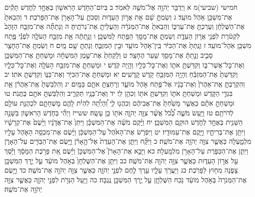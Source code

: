 \documentclass[twoside, openany, parskip=half, 11pt]{book}
\begin{document}
חמישי (שביעי)מ א וַיְדַבֵּ֥ר יְהֹוָ֖ה אֶל־מֹשֶׁ֥ה לֵּאמֹֽר׃ ב בְּיוֹם־הַחֹ֥דֶשׁ הָרִאשׁ֖וֹן בְּאֶחָ֣ד לַחֹ֑דֶשׁ תָּקִ֕ים אֶת־מִשְׁכַּ֖ן אֹ֥הֶל מוֹעֵֽד׃ ג וְשַׂמְתָּ֣ שָׁ֔ם אֵ֖ת אֲר֣וֹן הָעֵד֑וּת וְסַכֹּתָ֥ עַל־הָאָרֹ֖ן אֶת־הַפָּרֹֽכֶת׃ ד וְהֵבֵאתָ֙ אֶת־הַשֻּׁלְחָ֔ן וְעָרַכְתָּ֖ אֶת־עֶרְכּ֑וֹ וְהֵבֵאתָ֙ אֶת־הַמְּנֹרָ֔ה וְהַעֲלֵיתָ֖ אֶת־נֵרֹתֶֽיהָ׃ ה וְנָתַתָּ֞ה אֶת־מִזְבַּ֤ח הַזָּהָב֙ לִקְטֹ֔רֶת לִפְנֵ֖י אֲר֣וֹן הָעֵדֻ֑ת וְשַׂמְתָּ֛ אֶת־מָסַ֥ךְ הַפֶּ֖תַח לַמִּשְׁכָּֽן׃ ו וְנָ֣תַתָּ֔ה אֵ֖ת מִזְבַּ֣ח הָעֹלָ֑ה לִפְנֵ֕י פֶּ֖תַח מִשְׁכַּ֥ן אֹֽהֶל־מוֹעֵֽד׃ ז וְנָֽתַתָּ֙ אֶת־הַכִּיֹּ֔ר בֵּֽין־אֹ֥הֶל מוֹעֵ֖ד וּבֵ֣ין הַמִּזְבֵּ֑חַ וְנָתַתָּ֥ שָׁ֖ם מָֽיִם׃ ח וְשַׂמְתָּ֥ אֶת־הֶחָצֵ֖ר סָבִ֑יב וְנָ֣תַתָּ֔ אֶת־מָסַ֖ךְ שַׁ֥עַר הֶחָצֵֽר׃ ט וְלָקַחְתָּ֙ אֶת־שֶׁ֣מֶן הַמִּשְׁחָ֔ה וּמָשַׁחְתָּ֥ אֶת־הַמִּשְׁכָּ֖ן וְאֶת־כׇּל־אֲשֶׁר־בּ֑וֹ וְקִדַּשְׁתָּ֥ אֹת֛וֹ וְאֶת־כׇּל־כֵּלָ֖יו וְהָ֥יָה קֹֽדֶשׁ׃ י וּמָשַׁחְתָּ֛ אֶת־מִזְבַּ֥ח הָעֹלָ֖ה וְאֶת־כׇּל־כֵּלָ֑יו וְקִדַּשְׁתָּ֙ אֶת־הַמִּזְבֵּ֔חַ וְהָיָ֥ה הַמִּזְבֵּ֖חַ קֹ֥דֶשׁ קׇֽדָשִֽׁים׃ יא וּמָשַׁחְתָּ֥ אֶת־הַכִּיֹּ֖ר וְאֶת־כַּנּ֑וֹ וְקִדַּשְׁתָּ֖ אֹתֽוֹ׃ יב וְהִקְרַבְתָּ֤ אֶֽת־אַהֲרֹן֙ וְאֶת־בָּנָ֔יו אֶל־פֶּ֖תַח אֹ֣הֶל מוֹעֵ֑ד וְרָחַצְתָּ֥ אֹתָ֖ם בַּמָּֽיִם׃ יג וְהִלְבַּשְׁתָּ֙ אֶֽת־אַהֲרֹ֔ן אֵ֖ת בִּגְדֵ֣י הַקֹּ֑דֶשׁ וּמָשַׁחְתָּ֥ אֹת֛וֹ וְקִדַּשְׁתָּ֥ אֹת֖וֹ וְכִהֵ֥ן לִֽי׃ יד וְאֶת־בָּנָ֖יו תַּקְרִ֑יב וְהִלְבַּשְׁתָּ֥ אֹתָ֖ם כֻּתֳּנֹֽת׃ טו וּמָשַׁחְתָּ֣ אֹתָ֗ם כַּאֲשֶׁ֤ר מָשַׁ֙חְתָּ֙ אֶת־אֲבִיהֶ֔ם וְכִהֲנ֖וּ לִ֑י וְ֠הָיְתָ֠ה לִהְיֹ֨ת לָהֶ֧ם מׇשְׁחָתָ֛ם לִכְהֻנַּ֥ת עוֹלָ֖ם לְדֹרֹתָֽם׃ טז וַיַּ֖עַשׂ מֹשֶׁ֑ה כְּ֠כֹ֠ל אֲשֶׁ֨ר צִוָּ֧ה יְהֹוָ֛ה אֹת֖וֹ כֵּ֥ן עָשָֽׂה׃
ששייז וַיְהִ֞י בַּחֹ֧דֶשׁ הָרִאשׁ֛וֹן בַּשָּׁנָ֥ה הַשֵּׁנִ֖ית בְּאֶחָ֣ד לַחֹ֑דֶשׁ הוּקַ֖ם הַמִּשְׁכָּֽן׃ יח וַיָּ֨קֶם מֹשֶׁ֜ה אֶת־הַמִּשְׁכָּ֗ן וַיִּתֵּן֙ אֶת־אֲדָנָ֔יו וַיָּ֙שֶׂם֙ אֶת־קְרָשָׁ֔יו וַיִּתֵּ֖ן אֶת־בְּרִיחָ֑יו וַיָּ֖קֶם אֶת־עַמּוּדָֽיו׃ יט וַיִּפְרֹ֤שׂ אֶת־הָאֹ֙הֶל֙ עַל־הַמִּשְׁכָּ֔ן וַיָּ֜שֶׂם אֶת־מִכְסֵ֥ה הָאֹ֛הֶל עָלָ֖יו מִלְמָ֑עְלָה כַּאֲשֶׁ֛ר צִוָּ֥ה יְהֹוָ֖ה אֶת־מֹשֶֽׁה׃
כ וַיִּקַּ֞ח וַיִּתֵּ֤ן אֶת־הָעֵדֻת֙ אֶל־הָ֣אָרֹ֔ן וַיָּ֥שֶׂם אֶת־הַבַּדִּ֖ים עַל־הָאָרֹ֑ן וַיִּתֵּ֧ן אֶת־הַכַּפֹּ֛רֶת עַל־הָאָרֹ֖ן מִלְמָֽעְלָה׃ כא וַיָּבֵ֣א אֶת־הָאָרֹן֮ אֶל־הַמִּשְׁכָּן֒ וַיָּ֗שֶׂם אֵ֚ת פָּרֹ֣כֶת הַמָּסָ֔ךְ וַיָּ֕סֶךְ עַ֖ל אֲר֣וֹן הָעֵד֑וּת כַּאֲשֶׁ֛ר צִוָּ֥ה יְהֹוָ֖ה אֶת־מֹשֶֽׁה׃
כב וַיִּתֵּ֤ן אֶת־הַשֻּׁלְחָן֙ בְּאֹ֣הֶל מוֹעֵ֔ד עַ֛ל יֶ֥רֶךְ הַמִּשְׁכָּ֖ן צָפֹ֑נָה מִח֖וּץ לַפָּרֹֽכֶת׃ כג וַיַּעֲרֹ֥ךְ עָלָ֛יו עֵ֥רֶךְ לֶ֖חֶם לִפְנֵ֣י יְהֹוָ֑ה כַּאֲשֶׁ֛ר צִוָּ֥ה יְהֹוָ֖ה אֶת־מֹשֶֽׁה׃
כד וַיָּ֤שֶׂם אֶת־הַמְּנֹרָה֙ בְּאֹ֣הֶל מוֹעֵ֔ד נֹ֖כַח הַשֻּׁלְחָ֑ן עַ֛ל יֶ֥רֶךְ הַמִּשְׁכָּ֖ן נֶֽגְבָּה׃ כה וַיַּ֥עַל הַנֵּרֹ֖ת לִפְנֵ֣י יְהֹוָ֑ה כַּאֲשֶׁ֛ר צִוָּ֥ה יְהֹוָ֖ה אֶת־מֹשֶֽׁה׃
\end{document}
